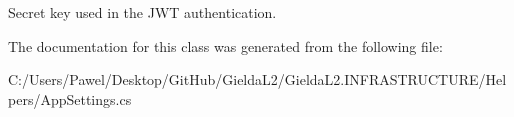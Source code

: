 Secret key used in the J\+WT authentication. 



The documentation for this class was generated from the following file\+:\begin{DoxyCompactItemize}
\item 
C\+:/\+Users/\+Pawel/\+Desktop/\+Git\+Hub/\+Gielda\+L2/\+Gielda\+L2.\+I\+N\+F\+R\+A\+S\+T\+R\+U\+C\+T\+U\+R\+E/\+Helpers/App\+Settings.\+cs\end{DoxyCompactItemize}
